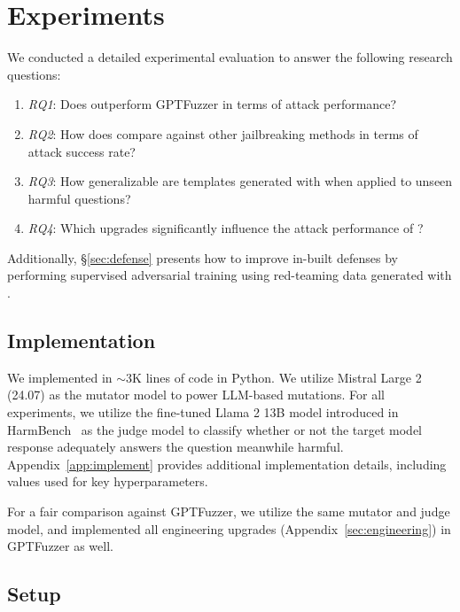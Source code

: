 \section{Experiments}
\label{sec:experiments}
We conducted a detailed experimental evaluation to answer the following research questions:
\begin{shaded1}
\begin{enumerate}[leftmargin=0pt, topsep=0pt,itemsep=1pt]
    \item[] \textit{RQ1}: Does \bedrockfuzz outperform GPTFuzzer in terms of attack performance?
    \item[] \textit{RQ2}: How does \bedrockfuzz compare against other jailbreaking methods in terms of attack success rate?
    \item[] \textit{RQ3}: How generalizable are templates generated with \bedrockfuzz when applied to unseen harmful questions?
    \item[] \textit{RQ4}: Which upgrades significantly influence the attack performance of \bedrockfuzz?
\end{enumerate}
\end{shaded1}

Additionally, \S\ref{sec:defense} presents how to improve in-built defenses by performing supervised adversarial training using red-teaming data generated with \bedrockfuzz.

\subsection{Implementation}
\label{sec:implement}
We implemented \bedrockfuzz in $\sim$3K lines of code in Python. We utilize Mistral Large 2 (24.07) as the mutator model to power LLM-based mutations. For all experiments, we utilize the fine-tuned Llama 2 13B model introduced in HarmBench~\cite{mazeika2024harmbench} as the judge model to classify whether or not the target model response adequately answers the question meanwhile harmful.
Appendix~\ref{app:implement} provides additional implementation details, including values used for key hyperparameters.

For a fair comparison against GPTFuzzer, we utilize the same mutator and judge model, and implemented all engineering upgrades (Appendix~\ref{sec:engineering}) in GPTFuzzer as well.

\subsection{Setup}
\label{sec:setup}

